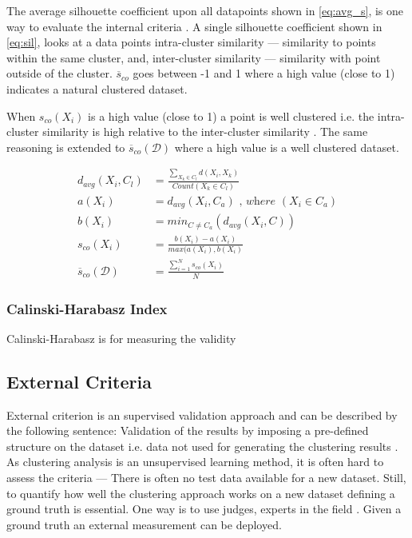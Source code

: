 \documentclass[../report.tex]{subfiles}
\begin{document}
The average silhouette coefficient upon all datapoints shown in \ref{eq:avg_s}, is one way to evaluate the internal criteria \cite{ROUSSEEUW198753}. A single silhouette coefficient shown in \ref{eq:sil}, looks at a data points intra-cluster similarity --- similarity to points within the same cluster, and, inter-cluster similarity --- similarity with point outside of the cluster. $\overline{s}_{co}$ goes between -1 and 1 where a high value (close to 1) indicates a natural clustered dataset.

When $s_{co}(X_i)$ is a high value (close to 1) a point is well clustered i.e. the intra-cluster similarity is high relative to the inter-cluster similarity \cite{ROUSSEEUW198753}
. The same reasoning is extended to $\overline{s}_{co}(\mathcal{D})$ where a high value is a well clustered dataset.

\begin{align}
  d_{avg}(X_i,C_l) &= \frac{\sum_{X_k \in C_l}d(X_i,X_k)}{Count(X_k \in C_l)} \\
  a(X_i) &= d_{avg}(X_i,C_a) \textit{ , where } (X_i \in C_a) \\
  b(X_i) &= min_{C \neq C_a}(d_{avg}(X_i,C)) \\
 \label{eq:sil}
  s_{co}(X_i) &= \frac{b(X_i) - a(X_i)}{max(a(X_i), b(X_i)} \\
\label{eq:avg_s}
  \overline{s}_{co}(\mathcal{D}) &= \frac{\sum^{N}_{i=1} s_{co}(X_i)}{N}
\end{align}

\subsubsection{Calinski-Harabasz Index}
Calinski-Harabasz is for measuring the validity


\subsection{External Criteria}
External criterion is an supervised validation approach and can be described by the following sentence: Validation of the results by imposing a pre-defined structure on the dataset i.e. data not used for generating the clustering results \cite{Halkidi2002}. As clustering analysis is an unsupervised learning method, it is often hard to assess the criteria --- There is often no test data available for a new dataset. Still, to quantify how well the clustering approach works on a new dataset defining a ground truth is essential. One way is to use judges, experts in the field \cite{manning2010introduction}. Given a ground truth an external measurement can be deployed.
\end{document}
